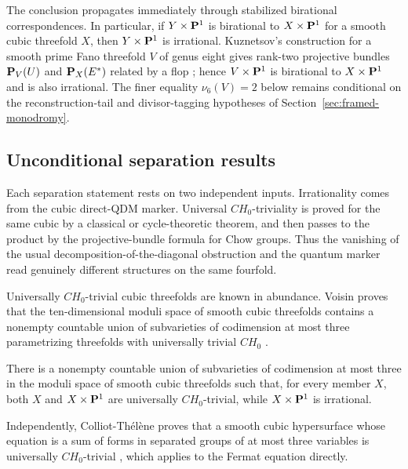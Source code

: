 The conclusion propagates immediately through stabilized birational
correspondences.  In particular, if \(Y\times\mathbf P^1\) is birational to
\(X\times\mathbf P^1\) for a smooth cubic threefold \(X\), then
\(Y\times\mathbf P^1\) is irrational.  Kuznetsov's construction for a smooth
prime Fano threefold \(V\) of genus eight gives rank-two projective bundles
\(\mathbf P_V(U)\) and \(\mathbf P_X(E^*)\) related by a flop
\cite[Theorems~2.17--2.18]{KuznetsovV14}; hence
\(V\times\mathbf P^1\) is birational to \(X\times\mathbf P^1\) and is also
irrational.  The finer equality \(\nu_6(V)=2\) below remains conditional on
the reconstruction-tail and divisor-tagging hypotheses of
Section~\ref{sec:framed-monodromy}.

\subsection*{Unconditional separation results}

Each separation statement rests on two independent inputs.  Irrationality
comes from the cubic direct-QDM marker.  Universal \(CH_0\)-triviality is proved
for the same cubic by a classical or cycle-theoretic theorem, and then
passes to the product by the projective-bundle formula for Chow groups.
Thus the vanishing of the usual decomposition-of-the-diagonal obstruction
and the quantum marker read genuinely different structures on the same
fourfold.

Universally \(CH_0\)-trivial cubic threefolds are known in abundance.
Voisin proves that the ten-dimensional moduli space of smooth cubic
threefolds contains a nonempty countable union of subvarieties of
codimension at most three parametrizing threefolds with universally trivial
\(CH_0\) \cite[Theorem~4.5]{Voisin}.

\begin{corollary}
\label{cor:voisin-separation}
%
%
%
%
There is a nonempty countable union of subvarieties of codimension at most
three in the moduli space of smooth cubic threefolds such that, for every
member \(X\), both \(X\) and \(X\times\mathbf P^1\) are universally
\(CH_0\)-trivial, while \(X\times\mathbf P^1\) is irrational.
\end{corollary}

Independently, Colliot-Th\'el\`ene proves that a smooth cubic hypersurface
whose equation is a sum of forms in separated groups of at most three
variables is universally \(CH_0\)-trivial \cite{CT}, which applies to the
Fermat equation directly.

